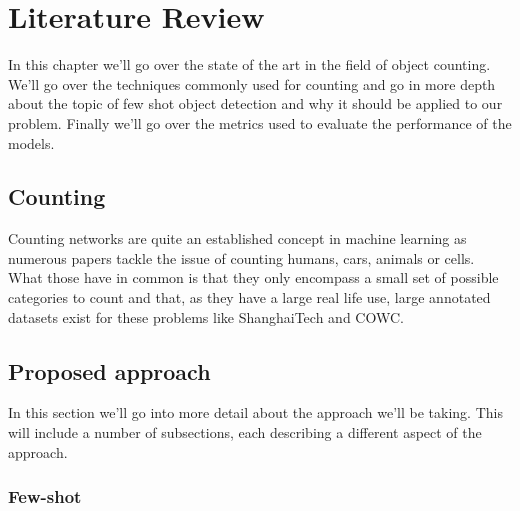 
\chapter{Literature Review}
    In this chapter we'll go over the state of the art in the field of object counting. We'll go over the techniques commonly used for counting and go in more depth about the topic of few shot object detection and why it should be applied to our problem. Finally we'll go over the metrics used to evaluate the performance of the models.

\section{Counting}
    Counting networks are quite an established concept in machine learning as numerous papers tackle the issue of counting humans, cars, animals or cells. What those have in common is that they only encompass a small set of possible categories to count and that, as they have a large real life use, large annotated datasets exist for these problems like ShanghaiTech and COWC. 


    
    
\section{Proposed approach}
    In this section we'll go into more detail about the approach we'll be taking.
    This will include a number of subsections, each describing a different aspect of the approach.
    \subsection{Few-shot}



